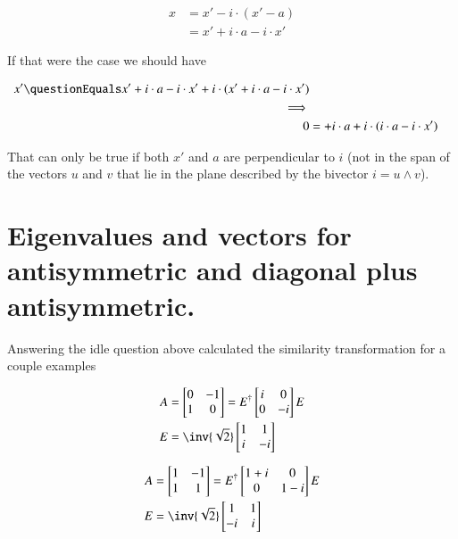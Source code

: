 \begin{align*}
x 
&= x' - i \cdot (x' - a) \\
&= x' + i \cdot a - i \cdot x' 
\end{align*}

If that were the case we should have

\begin{align*}
x' \questionEquals
x' + i \cdot a - i \cdot x' 
+ i \cdot (x' + i \cdot a - i \cdot x' ) \\
\implies \\
0 &=
+ i \cdot a 
+ i \cdot (i \cdot a - i \cdot x' ) \\
\end{align*}

That can only be true if both $x'$ and $a$ are perpendicular to $i$ (not in the span of the vectors $u$ and $v$ that lie in the plane described by the bivector $i = u \wedge v$).

\section{Eigenvalues and vectors for antisymmetric and diagonal plus antisymmetric.}

Answering the idle question above calculated the similarity transformation for a couple examples

\begin{align*}
A &= 
\begin{bmatrix}
0 & -1 \\
1 & 0  \\
\end{bmatrix} 
= E^\dagger 
\begin{bmatrix}
i & 0 \\
0 & -i \\
\end{bmatrix} 
E \\
E &=
\inv{\sqrt{2}}
\begin{bmatrix}
1 & 1 \\
i & -i \\
\end{bmatrix} 
\end{align*}

\begin{align*}
A &= 
\begin{bmatrix}
1 & -1 \\
1 & 1  \\
\end{bmatrix} 
= E^\dagger 
\begin{bmatrix}
1+i & 0 \\
0 & 1-i \\
\end{bmatrix} 
E \\
E &=
\inv{\sqrt{2}}
\begin{bmatrix}
1 & 1 \\
-i & i \\
\end{bmatrix} 
\end{align*}


